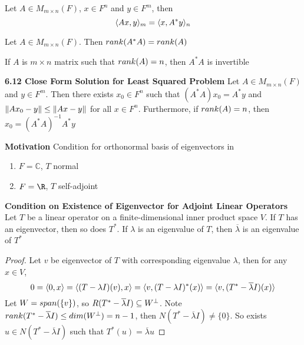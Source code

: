 \documentclass[11pt]{article}
\begin{document}
\begin{lemma*}
    Let $A\in M_{m\times n}(F)$, $x\in F^n$ and $y\in F^m$, then 
    \[
        \langle Ax,y\rangle_m = \langle x,A^*y\rangle_n    
    \]
\end{lemma*}

\begin{lemma*}
    Let $A\in M_{m\times n}(F)$. Then $rank(A^*A)=rank(A)$
\end{lemma*}

\begin{corollary*}
    If $A$ is $m\times n$ matrix such that $rank(A)=n$, then $A^*A$ is invertible
\end{corollary*}


\begin{theorem*}
    \textbf{6.12 Close Form Solution for Least Squared Problem} Let $A\in M_{m\times n}(F)$ and $y\in F^m$. Then there exists $x_0\in F^n$ such that $(A^*A)x_0 = A^*y$ and $\left\lVert Ax_0 - y\right\rVert \leq \left\lVert Ax -y\right\rVert$ for all $x\in F^n$. Furthermore, if $rank(A)=n$, then $x_0 = (A^*A)^{-1}A^*y$ 
\end{theorem*}



\begin{defn*}
    \textbf{Motivation} Condition for orthonormal basis of eigenvectors in 
    \begin{enumerate}
        \item $F = \mathbb{C}$, $T$ normal
        \item $F = \R$, $T$ self-adjoint
    \end{enumerate}
\end{defn*}

\begin{lemma*}
    \textbf{Condition on Existence of Eigenvector for Adjoint Linear Operators} Let $T$ be a linear operator on a finite-dimensional inner product space $V$. If $T$ has an eigenvector, then so does $T^*$. If $\lambda$ is an eigenvalue of $T$, then $\overline{\lambda}$ is an eigenvalue of $T^*$
    \begin{proof}
        Let $v$ be eigenvector of $T$ with corresponding eigenvalue $\lambda$, then for any $x\in V$,
        \[
            0 = \langle0,x\rangle = \langle(T-\lambda I)(v),x\rangle = \langle v,(T - \lambda I)^*(x)\rangle = \langle v,(T^* - \overline{\lambda} I)(x)\rangle
        \]
        Let $W = span(\{v\})$, so $R(T^* - \overline{\lambda}I) \subseteq W^{\perp}$. Note $rank(T^*-\overline{\lambda}I) \leq dim(W^{\perp}) = n-1$, then $N(T^* - \overline{\lambda}I) \neq \{0\}$. So exists $u\in N(T^* - \overline{\lambda}I)$ such that $T^*(u) = \overline{\lambda}u$
    \end{proof}
\end{lemma*}
\end{document}
